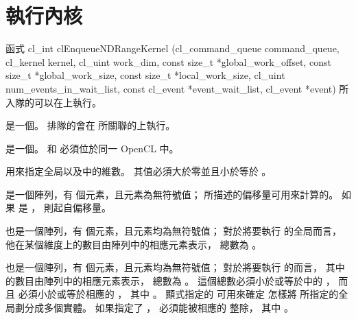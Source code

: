 \section{執行內核}

函式
\startCLFUNC
cl_int clEnqueueNDRangeKernel (cl_command_queue command_queue,
			cl_kernel kernel,
			cl_uint work_dim,
			const size_t *global_work_offset,
			const size_t *global_work_size,
			const size_t *local_work_size,
			cl_uint num_events_in_wait_list,
			const cl_event *event_wait_list,
			cl_event *event)
\stopCLFUNC
所入隊的可以在上執行。

 是一個。
排隊的會在  所關聯的上執行。

 是一個。
  和  必須位於同一 OpenCL 中。

 用來指定全局以及中的維數。
其值必須大於零並且小於等於 。

 是一個陣列，有  個元素，且元素為無符號值；
所描述的偏移量可用來計算的。
如果  是 ，
則起自偏移量。

 也是一個陣列，有  個元素，且元素均為無符號值；
對於將要執行  的全局而言，
他在某個維度上的數目由陣列中的相應元素表示，
總數為 。

 也是一個陣列，有  個元素，且元素均為無符號值；
對於將要執行  的而言，
其中的數目由陣列中的相應元素表示，
總數為 。
這個總數必須小於或等於中的 ，
而且  必須小於或等於相應的
 ，
其中 。
顯式指定的  可用來確定
怎樣將  所指定的全局劃分成多個實體。
如果指定了 ，
  必須能被相應的
  整除，
其中 。

